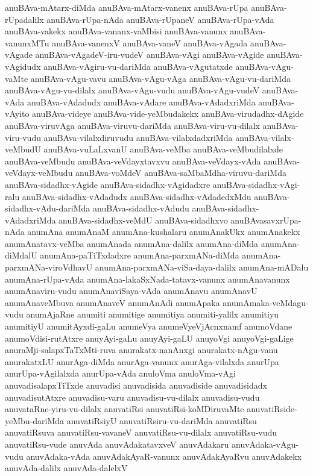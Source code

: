 {anuBAva-mAtarx-diMda
anuBAva-mAtarx-vanenx
anuBAva-rUpa
anuBAva-rUpadalilx
anuBAva-rUpa-nAda
anuBAva-rUpaneV
anuBAva-rUpa-vAda
anuBAva-vakekx
anuBAva-vananx-vaMbisi
anuBAva-vanunx
anuBAva-vanunxMTu
anuBAva-vanenxV
anuBAva-vaneV
anuBAva-vAgada
anuBAva-vAgade
anuBAva-vAgadeV-iru-vudeV
anuBAva-vAgi
anuBAva-vAgide
anuBAva-vAgidudx
anuBAva-vAgiru-vu-dariMda
anuBAva-vAgutatxde
anuBAva-vAgu-vaMte
anuBAva-vAgu-vavu
anuBAva-vAgu-vAga
anuBAva-vAgu-vu-dariMda
anuBAva-vAgu-vu-dilalx
anuBAva-vAgu-vudu
anuBAva-vAgu-vudeV
anuBAva-vAda
anuBAva-vAdadudx
anuBAva-vAdare
anuBAva-vAdadxriMda
anuBAva-vAyito
anuBAva-videye
anuBAva-vide-yeMbudakekx
anuBAva-virudadhx-dAgide
anuBAva-viruvAga
anuBAva-viruvu-dariMda
anuBAva-viru-vu-dilalx
anuBAva-viru-vudu
anuBAva-vilalxdiruvudu
anuBAva-vilalxdadxriMda
anuBAva-vilalx-veMbudU
anuBAva-vuLaLxvanU
anuBAva-veMba
anuBAva-veMbudilalxde
anuBAva-veMbudu
anuBAva-veVdayxtavxvu
anuBAva-veVdayx-vAda
anuBAva-veVdayx-veMbudu
anuBAva-voMdeV
anuBAva-saMbaMdha-viruvu-dariMda
anuBAva-sidadhx-vAgide
anuBAva-sidadhx-vAgidadxre
anuBAva-sidadhx-vAgi-ralu
anuBAva-sidadhx-vAdadudx
anuBAva-sidadhx-vAdadedxMdu
anuBAva-sidadhx-vAdu-dariMda
anuBAva-sidadhx-vAdudu
anuBAva-sidadhx-vAdadxriMda
anuBAva-sidadhx-veMdU
anuBAva-sidadhxvo
anuBAvasavxrUpa-nAda
anumAna
anumAnaM
anumAna-kushalaru
anumAnakUkx
anumAnakekx
anumAnatavx-veMba
anumAnada
anumAna-dalilx
anumAna-diMda
anumAna-diMdalU
anumAna-paTiTxdadxre
anumAna-parxmANa-diMda
anumAna-parxmANa-viroVdhavU
anumAna-parxmANa-viSa-daya-dalilx
anumAna-mADalu
anumAna-rUpa-vAda
anumAna-lakaSxNada-tatavx-vanunx
anumAnavanunx
anumAnaviru-vudu
anumAnaviSaya-vAda
anumAnavu
anumAnavU
anumAnaveMbuva
anumAnaveV
anumAnAdi
anumApaka
anumAmaka-veMdagu-vudu
anumAjaRne
anumiti
anumitige
anumitiya
anumiti-yalilx
anumitiyu
anumitiyU
anumitAyxdi-gaLu
anumeVya
anumeVyeVjAcnxnamf
anumoVdane
anumoVdisi-rutAtxre
anuyAyi-gaLu
anuyAyi-gaLU
anuyoVgi
anuyoVgi-gaLige
anuraMji-salapxTaTxMti-ruva
anurakatx-nanAnxgi
anurakatx-nAgu-vanu
anurakatxLU
anurAga-diMda
anurAga-vanunx
anurAga-vilalxda
anurUpa
anurUpa-vAgilalxda
anurUpa-vAda
anuloVma
anuloVma-vAgi
anuvadisalapxTiTxde
anuvadisi
anuvadisida
anuvadiside
anuvadisidadx
anuvadisutAtxre
anuvadisu-varu
anuvadisu-vu-dilalx
anuvadisu-vudu
anuvataRne-yiru-vu-dilalx
anuvatiRsi
anuvatiRsi-koMDiruvaMte
anuvatiRside-yeMbu-dariMda
anuvatiRsiyU
anuvatiRsiru-vu-dariMda
anuvatiRsu
anuvatiRsuva
anuvatiRsu-vavaneV
anuvatiRsu-vu-dilalx
anuvatiRsu-vudu
anuvatiRsu-vude
anuvAda
anuvAdakatavxveV
anuvAdakaru
anuvAdaka-vAgu-vudu
anuvAdaka-vAda
anuvAdakAyaR-vanunx
anuvAdakAyaRvu
anuvAdakekx
anuvAda-dalilx
anuvAda-dalelxV
}

